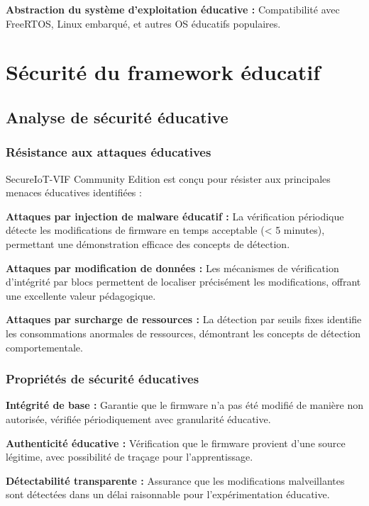 \textbf{Abstraction du système d'exploitation éducative :} Compatibilité avec FreeRTOS, Linux embarqué, et autres OS éducatifs populaires.

\section{Sécurité du framework éducatif}

\subsection{Analyse de sécurité éducative}

\subsubsection{Résistance aux attaques éducatives}

SecureIoT-VIF Community Edition est conçu pour résister aux principales menaces éducatives identifiées :

\textbf{Attaques par injection de malware éducatif :} La vérification périodique détecte les modifications de firmware en temps acceptable (< 5 minutes), permettant une démonstration efficace des concepts de détection.

\textbf{Attaques par modification de données :} Les mécanismes de vérification d'intégrité par blocs permettent de localiser précisément les modifications, offrant une excellente valeur pédagogique.

\textbf{Attaques par surcharge de ressources :} La détection par seuils fixes identifie les consommations anormales de ressources, démontrant les concepts de détection comportementale.

\subsubsection{Propriétés de sécurité éducatives}

\textbf{Intégrité de base :} Garantie que le firmware n'a pas été modifié de manière non autorisée, vérifiée périodiquement avec granularité éducative.

\textbf{Authenticité éducative :} Vérification que le firmware provient d'une source légitime, avec possibilité de traçage pour l'apprentissage.

\textbf{Détectabilité transparente :} Assurance que les modifications malveillantes sont détectées dans un délai raisonnable pour l'expérimentation éducative.

